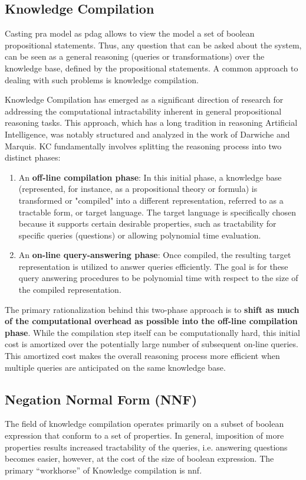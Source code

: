 \subsection{Knowledge Compilation}
Casting \acrshort{pra} model as \acrshort{pdag} allows to view the model a set of boolean propositional statements. Thus, any question that can be asked about the system, can be seen as a general reasoning (queries or transformations) over the knowledge base, defined by the propositional statements. A common approach to dealing with such problems is knowledge compilation.

Knowledge Compilation has emerged as a significant direction of research for addressing the computational intractability inherent in general propositional reasoning tasks. This approach, which has a long tradition in reasoning Artificial Intelligence, was notably structured and analyzed in the work of Darwiche and Marquis. KC fundamentally involves splitting the reasoning process into two distinct phases:
\begin{enumerate}
    \item An \textbf{off-line compilation phase}: In this initial phase, a knowledge base (represented, for instance, as a propositional theory or formula) is transformed or "compiled" into a different representation, referred to as a tractable form, or target language. The target language is specifically chosen because it supports certain desirable properties, such as tractability for specific queries (questions) or allowing polynomial time evaluation.
    \item An \textbf{on-line query-answering phase}: Once compiled, the resulting target representation is utilized to answer queries efficiently. The goal is for these query answering procedures to be polynomial time with respect to the size of the compiled representation.
\end{enumerate}
The primary rationalization behind this two-phase approach is to \textbf{shift as much of the computational overhead as possible into the off-line compilation phase}. While the compilation step itself can be computationally hard, this initial cost is amortized over the potentially large number of subsequent on-line queries. This amortized cost makes the overall reasoning process more efficient when multiple queries are anticipated on the same knowledge base.

\subsection{Negation Normal Form (NNF)}
The field of knowledge compilation operates primarily on a subset of boolean expression that conform to a set of properties. In general, imposition of more properties results increased tractability of the queries, i.e. answering questions becomes easier, however, at the cost of the size of boolean expression. The primary ``workhorse'' of Knowledge compilation is \acrfull{nnf}.

